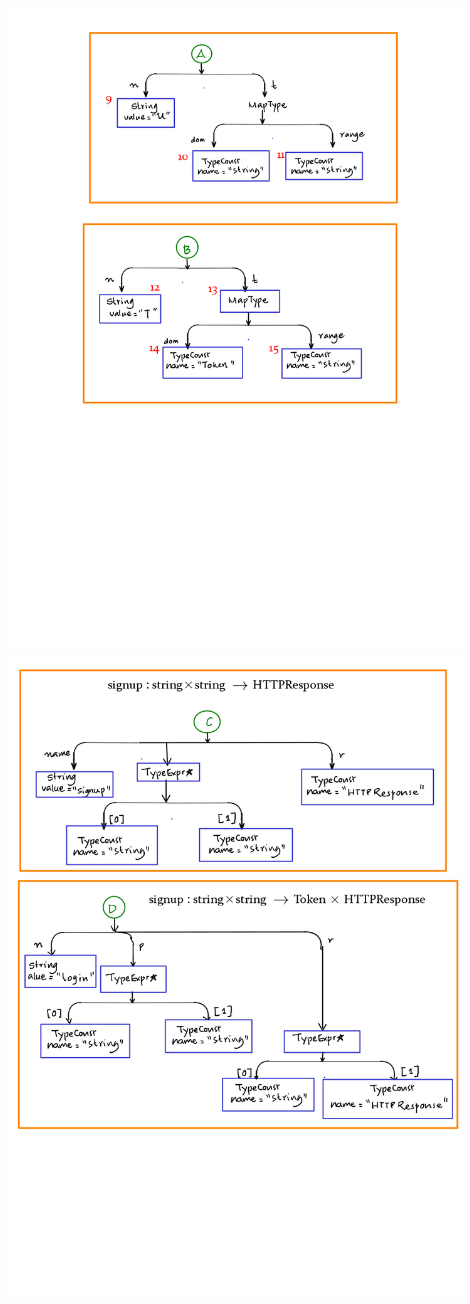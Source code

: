\documentclass[12pts, a4paper]{article}
\begin{document}
\begin{center}
\includegraphics[width=0.9\textwidth]{images/spec-AST-3.png}
\includegraphics[width=0.9\textwidth]{images/spec-AST-4.png}

\end{center}
\end{document}
